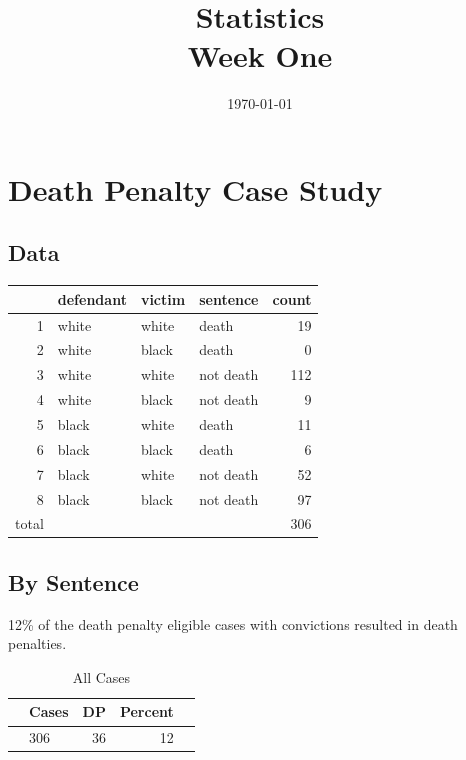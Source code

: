 \documentclass[letterpaper, landscape]{article}
\author{}
\date{\today}
\title{Statistics \\ Week One}
\begin{document}
  \maketitle
  \tableofcontents

  \section{Death Penalty Case Study}
  
  \subsection{Data}
  \begin{table}[ht]
  \centering
  \begin{tabular}{rlllr}
    \toprule
          & defendant & victim & sentence  & count \\
    \midrule
    1     & white & white & death     & 19 \\
    2     & white & black & death     & 0 \\
    3     & white & white & not death & 112 \\
    4     & white & black & not death & 9 \\
    5     & black & white & death     & 11 \\
    6     & black & black & death     & 6 \\
    7     & black & white & not death & 52 \\
    8     & black & black & not death & 97 \\
    \midrule
    total &       &       &           & 306 \\
    \bottomrule
  \end{tabular}
  \end{table}

  \subsection{By Sentence}

  12\% of the death penalty eligible cases with convictions resulted in death penalties.

  \begin{table}[H]
    \centering
    \begin{tabular}{rlrrr}
      \toprule
      & Cases & DP & Percent \\
      \midrule
      & 306   & 36 & 12 \\
     \bottomrule
    \end{tabular}
    \caption{All Cases}
  \end{table}
\end{document}
